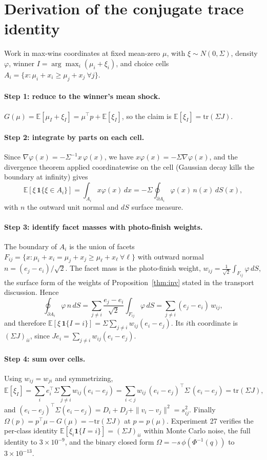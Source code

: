 \documentclass[12pt]{article}
\theoremstyle{remark}
\newcommand{\E}{\mathbb{E}}
\begin{document}
\section{Derivation of the conjugate trace identity}\label{app:trace}

Work in max-wins coordinates at fixed mean-zero $\mu$, with $\xi \sim
N(0, \Sigma)$, density $\varphi$, winner $I = \arg\max_i (\mu_i +
\xi_i)$, and choice cells $A_i = \{x : \mu_i + x_i \ge \mu_j + x_j
\ \forall j\}$.

\paragraph{Step 1: reduce to the winner's mean shock.} $G(\mu) =
\E[\mu_I + \xi_I] = \mu^\top p + \E[\xi_I]$, so the claim is
$\E[\xi_I] = \mathrm{tr}(\Sigma J)$.

\paragraph{Step 2: integrate by parts on each cell.} Since
$\nabla \varphi(x) = -\Sigma^{-1} x\, \varphi(x)$, we have $x
\varphi(x) = -\Sigma \nabla\varphi(x)$, and the divergence theorem
applied coordinatewise on the cell (Gaussian decay kills the boundary
at infinity) gives
\[
\E[\xi\, \mathbf{1}\{\xi \in A_i\}]
= \int_{A_i} x \varphi(x)\,dx
= -\Sigma \oint_{\partial A_i} \varphi(x)\, n(x)\, dS(x),
\]
with $n$ the outward unit normal and $dS$ surface measure.

\paragraph{Step 3: identify facet masses with photo-finish weights.}
The boundary of $A_i$ is the union of facets $F_{ij} = \{x : \mu_i +
x_i = \mu_j + x_j \ge \mu_\ell + x_\ell \ \forall \ell\}$ with
outward normal $n = (e_j - e_i)/\sqrt2$. The facet mass is the
photo-finish weight, $w_{ij} = \tfrac{1}{\sqrt2}\int_{F_{ij}}
\varphi\, dS$, the surface form of the weights of
Proposition~\ref{thm:inv} stated in the transport discussion. Hence
\[
\oint_{\partial A_i} \varphi\, n\, dS
= \sum_{j \ne i} \frac{e_j - e_i}{\sqrt2} \int_{F_{ij}} \varphi\, dS
= \sum_{j\ne i} (e_j - e_i)\, w_{ij},
\]
and therefore $\E[\xi\, \mathbf{1}\{I = i\}] = \Sigma \sum_{j \ne
i} w_{ij} (e_i - e_j)$. Its $i$th coordinate is $(\Sigma J)_{ii}$,
since $J e_i = \sum_{j \ne i} w_{ij}(e_i - e_j)$.

\paragraph{Step 4: sum over cells.} Using $w_{ij} = w_{ji}$ and
symmetrizing,
\[
\E[\xi_I] = \sum_i e_i^\top \Sigma \sum_{j\ne i} w_{ij}(e_i - e_j)
= \sum_{i<j} w_{ij}\, (e_i - e_j)^\top \Sigma\, (e_i - e_j)
= \mathrm{tr}(\Sigma J),
\]
and $(e_i - e_j)^\top \Sigma (e_i - e_j) = D_i + D_j + \|v_i -
v_j\|^2 = s_{ij}^2$. Finally $\Omega(p) = p^\top \mu - G(\mu) =
-\mathrm{tr}(\Sigma J)$ at $p = p(\mu)$. Experiment 27 verifies the
per-class identity $\E[\xi_i \mathbf{1}\{I=i\}] = (\Sigma J)_{ii}$
within Monte Carlo noise, the full identity to $3\times10^{-9}$, and
the binary closed form $\Omega = -s\,\phi(\Phi^{-1}(q))$ to
$3\times10^{-13}$.
\end{document}

